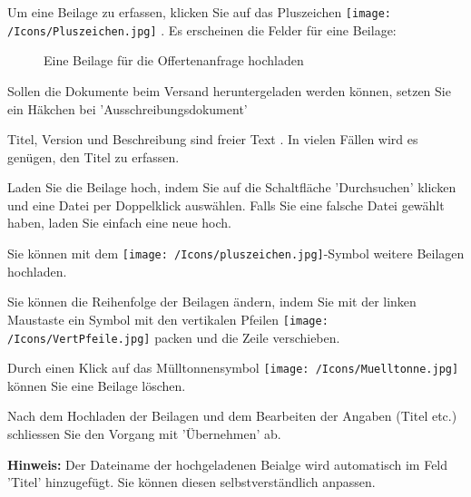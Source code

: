 \vspace{\baselineskip}

Um eine Beilage zu erfassen, klicken Sie auf das Pluszeichen \texttt{[image: /Icons/Pluszeichen.jpg]} . Es erscheinen die Felder für eine Beilage:

\begin{figure}[H]
\caption{Eine Beilage für die Offertenanfrage hochladen}
\end{figure}

\begin{compactitem}
\item Sollen die Dokumente beim Versand heruntergeladen werden können, setzen Sie ein Häkchen bei 'Ausschreibungsdokument' 
\item Titel, Version und Beschreibung sind freier Text . In vielen Fällen wird es genügen, den Titel zu erfassen.
\item Laden Sie die Beilage hoch, indem Sie auf die Schaltfläche 'Durchsuchen'  klicken und eine Datei per Doppelklick auswählen. Falls Sie
eine falsche Datei gewählt haben, laden Sie einfach eine neue hoch.
\item Sie können mit dem \texttt{[image: /Icons/pluszeichen.jpg]}-Symbol  weitere Beilagen hochladen.
\item Sie können die Reihenfolge der Beilagen ändern, indem Sie mit der linken Maustaste ein Symbol mit den vertikalen Pfeilen \texttt{[image: /Icons/VertPfeile.jpg]}  packen und die Zeile verschieben.
\item Durch einen Klick auf das Mülltonnensymbol \texttt{[image: /Icons/Muelltonne.jpg]}  können Sie eine Beilage löschen.
\item Nach dem Hochladen der Beilagen und dem Bearbeiten der Angaben (Titel etc.) schliessen Sie den Vorgang mit 'Übernehmen'  ab.
\end{compactitem}

\vspace{\baselineskip}

\textbf{Hinweis:} Der Dateiname der hochgeladenen Beialge wird automatisch im Feld 'Titel' hinzugefügt. Sie können diesen selbstverständlich anpassen.

